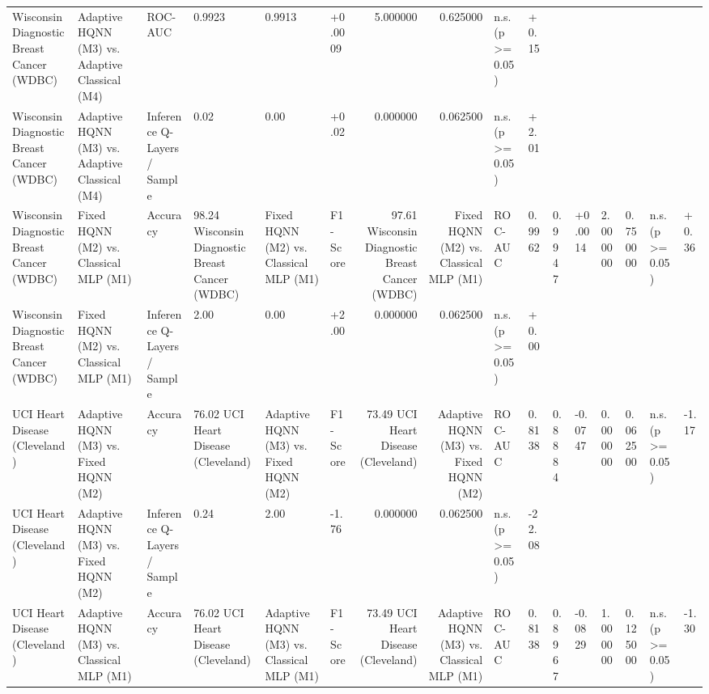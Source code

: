\begin{table}
\begin{tabular}{llllllrrll}
Wisconsin Diagnostic Breast Cancer (WDBC) & Adaptive HQNN (M3) vs. Adaptive Classical (M4) & ROC-AUC & 0.9923 & 0.9913 & +0.0009 & 5.000000 & 0.625000 & n.s. (p >= 0.05) & +0.15 \\
Wisconsin Diagnostic Breast Cancer (WDBC) & Adaptive HQNN (M3) vs. Adaptive Classical (M4) & Inference Q-Layers / Sample & 0.02 & 0.00 & +0.02 & 0.000000 & 0.062500 & n.s. (p >= 0.05) & +2.01 \\
Wisconsin Diagnostic Breast Cancer (WDBC) & Fixed HQNN (M2) vs. Classical MLP (M1) & Accuracy & 98.24%
Wisconsin Diagnostic Breast Cancer (WDBC) & Fixed HQNN (M2) vs. Classical MLP (M1) & F1-Score & 97.61%
Wisconsin Diagnostic Breast Cancer (WDBC) & Fixed HQNN (M2) vs. Classical MLP (M1) & ROC-AUC & 0.9962 & 0.9947 & +0.0014 & 2.000000 & 0.750000 & n.s. (p >= 0.05) & +0.36 \\
Wisconsin Diagnostic Breast Cancer (WDBC) & Fixed HQNN (M2) vs. Classical MLP (M1) & Inference Q-Layers / Sample & 2.00 & 0.00 & +2.00 & 0.000000 & 0.062500 & n.s. (p >= 0.05) & +0.00 \\
UCI Heart Disease (Cleveland) & Adaptive HQNN (M3) vs. Fixed HQNN (M2) & Accuracy & 76.02%
UCI Heart Disease (Cleveland) & Adaptive HQNN (M3) vs. Fixed HQNN (M2) & F1-Score & 73.49%
UCI Heart Disease (Cleveland) & Adaptive HQNN (M3) vs. Fixed HQNN (M2) & ROC-AUC & 0.8138 & 0.8884 & -0.0747 & 0.000000 & 0.062500 & n.s. (p >= 0.05) & -1.17 \\
UCI Heart Disease (Cleveland) & Adaptive HQNN (M3) vs. Fixed HQNN (M2) & Inference Q-Layers / Sample & 0.24 & 2.00 & -1.76 & 0.000000 & 0.062500 & n.s. (p >= 0.05) & -22.08 \\
UCI Heart Disease (Cleveland) & Adaptive HQNN (M3) vs. Classical MLP (M1) & Accuracy & 76.02%
UCI Heart Disease (Cleveland) & Adaptive HQNN (M3) vs. Classical MLP (M1) & F1-Score & 73.49%
UCI Heart Disease (Cleveland) & Adaptive HQNN (M3) vs. Classical MLP (M1) & ROC-AUC & 0.8138 & 0.8967 & -0.0829 & 1.000000 & 0.125000 & n.s. (p >= 0.05) & -1.30 \\

\end{tabular}
\end{table}
